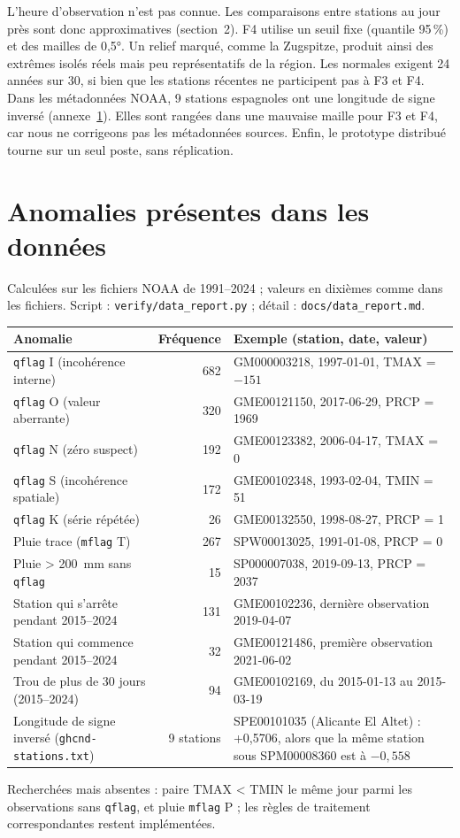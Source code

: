 \documentclass{rapportClass}
\renewcommand{\thesection}{\arabic{section}}
\newcommand{\cmd}[1]{\texttt{#1}}
\begin{document}
L'heure d'observation n'est pas connue. Les comparaisons entre stations au jour près sont donc approximatives
(section~2). F4 utilise un seuil fixe (quantile 95\,\%) et des mailles de 0,5°. Un relief marqué, comme la
Zugspitze, produit ainsi des extrêmes isolés réels mais peu représentatifs de la région. Les normales exigent
24 années sur 30, si bien que les stations récentes ne participent pas à F3 et F4. Dans les métadonnées NOAA,
9 stations espagnoles ont une longitude de signe inversé (annexe~\ref{ann:anomalies}). Elles sont rangées dans
une mauvaise maille pour F3 et F4, car nous ne corrigeons pas les métadonnées sources. Enfin, le prototype
distribué tourne sur un seul poste, sans réplication.

\appendix
\renewcommand{\thesection}{\Alph{section}}
\section{Anomalies présentes dans les données}\label{ann:anomalies}

Calculées sur les fichiers NOAA de 1991--2024 ; valeurs en dixièmes comme dans les fichiers.
Script : \cmd{verify/data\_report.py} ; détail : \cmd{docs/data\_report.md}.

\begin{table}[H]
\centering\small
\begin{tabularx}{\textwidth}{>{\raggedright\arraybackslash}p{4.2cm}r>{\raggedright\arraybackslash}X}
\toprule
Anomalie & Fréquence & Exemple (station, date, valeur) \\
\midrule
\cmd{qflag} I (incohérence interne) & 682 & GM000003218, 1997-01-01, TMAX = $-151$ \\
\cmd{qflag} O (valeur aberrante) & 320 & GME00121150, 2017-06-29, PRCP = 1969 \\
\cmd{qflag} N (zéro suspect) & 192 & GME00123382, 2006-04-17, TMAX = 0 \\
\cmd{qflag} S (incohérence spatiale) & 172 & GME00102348, 1993-02-04, TMIN = 51 \\
\cmd{qflag} K (série répétée) & 26 & GME00132550, 1998-08-27, PRCP = 1 \\
Pluie trace (\cmd{mflag} T) & 267 & SPW00013025, 1991-01-08, PRCP = 0 \\
Pluie > 200~mm sans \cmd{qflag} & 15 & SP000007038, 2019-09-13, PRCP = 2037 \\
Station qui s'arrête pendant 2015--2024 & 131 & GME00102236, dernière observation 2019-04-07 \\
Station qui commence pendant 2015--2024 & 32 & GME00121486, première observation 2021-06-02 \\
Trou de plus de 30 jours (2015--2024) & 94 & GME00102169, du 2015-01-13 au 2015-03-19 \\
Longitude de signe inversé (\cmd{ghcnd-stations.txt}) & 9 stations & SPE00101035 (Alicante El Altet) : +0,5706, alors que la même station sous SPM00008360 est à $-0{,}558$ \\
\bottomrule
\end{tabularx}
\end{table}

Recherchées mais absentes : paire TMAX < TMIN le même jour parmi les observations sans \cmd{qflag},
et pluie \cmd{mflag} P ; les règles de traitement correspondantes restent implémentées.
\end{document}
